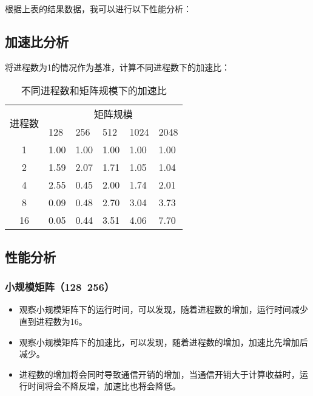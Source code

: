 \documentclass{SYSUReport}
\begin{document}
根据上表的结果数据，我可以进行以下性能分析：

\subsection{加速比分析}
将进程数为1的情况作为基准，计算不同进程数下的加速比：

\begin{table}[H]
\centering
\begin{tabular}{|c|lllll|}
\hline
\multirow{2}{*}{进程数} & \multicolumn{5}{c|}{矩阵规模}                                                                        \\ \cline{2-6} 
 & \multicolumn{1}{l|}{128} & \multicolumn{1}{l|}{256} & \multicolumn{1}{l|}{512} & \multicolumn{1}{l|}{1024} & 2048 \\ \hline
1                    & \multicolumn{1}{l|}{1.00} & \multicolumn{1}{l|}{1.00} & \multicolumn{1}{l|}{1.00} & \multicolumn{1}{l|}{1.00} & 1.00 \\ \hline
2                    & \multicolumn{1}{l|}{1.59} & \multicolumn{1}{l|}{2.07} & \multicolumn{1}{l|}{1.71} & \multicolumn{1}{l|}{1.05} & 1.04 \\ \hline
4                    & \multicolumn{1}{l|}{2.55} & \multicolumn{1}{l|}{0.45} & \multicolumn{1}{l|}{2.00} & \multicolumn{1}{l|}{1.74} & 2.01 \\ \hline
8                    & \multicolumn{1}{l|}{0.09} & \multicolumn{1}{l|}{0.48} & \multicolumn{1}{l|}{2.70} & \multicolumn{1}{l|}{3.04} & 3.73 \\ \hline
16                   & \multicolumn{1}{l|}{0.05} & \multicolumn{1}{l|}{0.44} & \multicolumn{1}{l|}{3.51} & \multicolumn{1}{l|}{4.06} & 7.70 \\ \hline
\end{tabular}
\caption{不同进程数和矩阵规模下的加速比}
\end{table}

\subsection{性能分析}

\subsubsection{小规模矩阵（128~256）}
\begin{itemize}
    \item 观察小规模矩阵下的运行时间，可以发现，随着进程数的增加，运行时间减少直到进程数为16。
    \item 观察小规模矩阵下的加速比，可以发现，随着进程数的增加，加速比先增加后减少。
    \item 进程数的增加将会同时导致通信开销的增加，当通信开销大于计算收益时，运行时间将会不降反增，加速比也将会降低。
\end{itemize}
\end{document}
